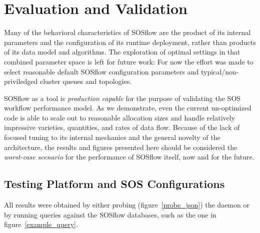 
\section{Evaluation and Validation}

Many of the behavioral characteristics of SOSflow are the product of
its internal parameters and the configuration of its runtime
deployment, rather than products of its data model and algorithms.
%
The exploration of optimal settings in that combined parameter space
is left for future work: For now the effort was made to select
reasonable default SOSflow configuration parameters and
typical/non-priviledged cluster queues and topologies.

SOSflow as a tool is \textit{production capable} for the purpose of
validating the SOS workflow performance model.
%
As we demonstrate, even the current un-optimized code is able to scale
out to reasonable allocation sizes and handle relatively impressive
varieties, quantities, and rates of data flow.
%
Because of the lack of focused tuning to its internal mechanics and
the general novelty of the architecture, the results and figures
presented here should be considered the \textit{worst-case scenario}
for the performance of SOSflow itself, now and for the future.




%
%




\subsection{Testing Platform and SOS Configurations}
All results were obtained by either probing (figure~\ref{probe_json})
the daemon or by running queries against the SOSflow databases, such
as the one in figure~\ref{example_query}.

